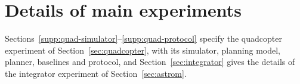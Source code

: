 \documentclass{l4dc2027}
\begin{document}
%
%
%

\section{Details of main experiments}\label{supp:quadcopter}


Sections~\ref{supp:quad-simulator}--\ref{supp:quad-protocol} specify the quadcopter experiment of Section~\ref{sec:quadcopter}, with its simulator, planning model, planner, baselines and protocol, and Section~\ref{sec:integrator} gives the details of the integrator experiment of Section~\ref{sec:astrom}. 
\end{document}

